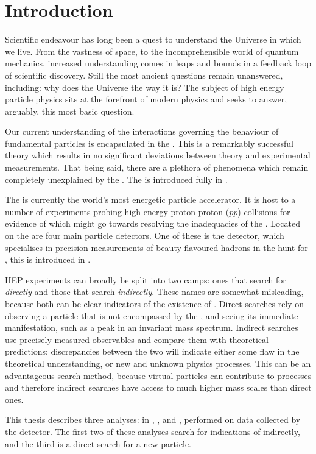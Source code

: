 \chapter{Introduction}
\label{ch:intro}

Scientific endeavour has long been a quest to understand the Universe in which we live.
From the vastness of space, to the incomprehensible world of quantum mechanics,
increased understanding comes in leaps and bounds in a feedback loop of scientific discovery.
Still the most ancient questions remain unanswered, including: why does the Universe the way it is?
The subject of high energy particle physics sits at the forefront of modern physics and seeks to
answer, arguably, this most basic question.

Our current understanding of the interactions governing the behaviour of fundamental particles is
encapsulated in the \sm.
This is a remarkably successful theory which results in no significant deviations between theory
and experimental measurements.
That being said, there are a plethora of phenomena which remain completely unexplained by the \sm.
The \sm is introduced fully in .

The \lhc is currently the world's most energetic particle accelerator.
It is host to a number of
experiments probing high energy proton-proton ($pp$) collisions for evidence of \np
which might go towards resolving the inadequacies of the \sm.
Located on the \lhc are four main particle detectors.
One of these is the \lhcb detector, which
specialises in precision measurements of beauty flavoured hadrons in the hunt for \np, this is
introduced in .

\gls{HEP} experiments can broadly be split into two camps: ones that search for \np
\emph{directly} and those that search \emph{indirectly}.
These names are somewhat misleading, because both can be clear indicators of the existence of
\np.
Direct searches rely on observing a particle that is not encompassed by the \sm,
and seeing its immediate manifestation, such as a peak in an invariant mass spectrum.
Indirect searches
use precisely measured observables and compare them with theoretical predictions; discrepancies
between the two will indicate either some flaw in the theoretical understanding, or new and unknown
physics processes.
This can be an advantageous search method, because virtual particles can contribute to processes
and therefore indirect searches have access to much higher mass scales than direct ones.

This thesis describes three analyses: in , , and ,
performed on data collected by the \lhcb detector.
The first two of these analyses search for indications of \np indirectly, and the third is a
direct search for a new particle.


\clearpage
